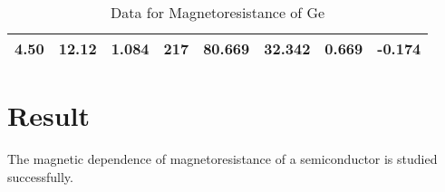 \begin{table}[H]
\begin{tabular}{|r|r|r|r|r|r|r|r|}
		4.50                                                                                                  & 12.12                                                                                                        & 1.084                                             & 217                                                                                                    & 80.669                                                                                          & 32.342                                               & 0.669                                                    & -0.174                                                \\ \hline
	\end{tabular}
	\caption{Data for Magnetoresistance of Ge}
	\label{tab:magneto}
\end{table}

\section{Result}
The magnetic dependence of magnetoresistance of a semiconductor is studied successfully.


